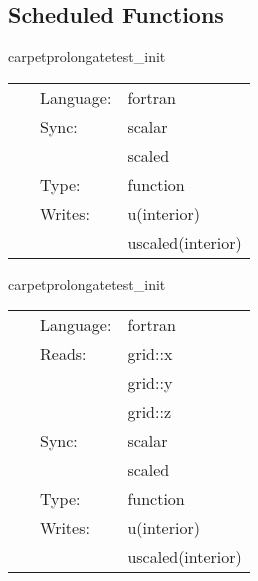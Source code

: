 \subsection*{Scheduled Functions}
\vspace{5mm}


\hspace{5mm} carpetprolongatetest\_init 

\hspace{5mm}{\it set up initial data } 


\hspace{5mm}

 \begin{tabular*}{160mm}{cll} 
~ & Language:  & fortran \\ 
~ & Sync:  & scalar \\ 
~& ~ &scaled\\ 
~ & Type:  & function \\ 
~ & Writes:  & u(interior) \\ 
~& ~ &uscaled(interior)\\ 
\end{tabular*} 


\vspace{5mm}


\hspace{5mm} carpetprolongatetest\_init 

\hspace{5mm}{\it set up initial data } 


\hspace{5mm}

 \begin{tabular*}{160mm}{cll} 
~ & Language:  & fortran \\ 
~ & Reads:  & grid::x \\ 
~& ~ &grid::y\\ 
~& ~ &grid::z\\ 
~ & Sync:  & scalar \\ 
~& ~ &scaled\\ 
~ & Type:  & function \\ 
~ & Writes:  & u(interior) \\ 
~& ~ &uscaled(interior)\\ 
\end{tabular*} 


\vspace{5mm}


